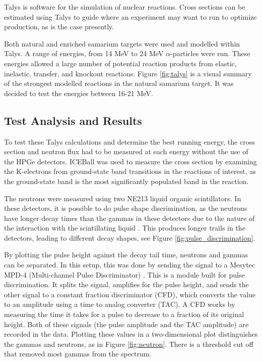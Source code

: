 Talys \citep{koning07:_talys} is software for the simulation of nuclear reactions. Cross sections can be estimated using Talys to guide where an experiment may want to run to optimize production, as is the case presently. 

Both natural and enriched samarium targets were used and modelled within Talys. A range of energies, from 14 MeV to 24 MeV $\alpha$-particles were run. These energies allowed a large number of potential reaction products from elastic, inelastic, transfer, and knockout reactions. Figure \ref{fig:talys} is a visual summary of the strongest modelled reactions in the natural samarium target. It was decided to test the energies between 16-21 MeV.



\subsection{Test Analysis and Results}

To test these Talys calculations and determine the best running energy, the cross section and neutron flux had to be measured at each energy without the use of the HPGe detectors. ICEBall was used to measure the cross section by examining the K-electrons from ground-state band transitions in the reactions of interest, as the ground-state band is the most significantly populated band in the reaction.

The neutrons were measured using two NE213 liquid organic scintillators. In these detectors, it is possible to do pulse shape discrimination, as the neutrons have longer decay times than the gammas in these detectors due to the nature of the interaction with the scintillating liquid \citep{knoll00:rad_det_meas}. This produces longer trails in the detectors, leading to different decay shapes, see Figure \ref{fig:pulse_discrimination}. 



By plotting the pulse height against the decay tail time, neutrons and gammas can be separated. In this setup, this was done by sending the signal to a Mesytec MPD-4 (Multi-channel Pulse Discriminator) \citep{mesytec:_PSD}. This is a module built for pulse discrimination. It splits the signal, amplifies for the pulse height, and sends the other signal to a constant fraction discriminator (CFD), which converts the value to an amplitude using a time to analog converter (TAC). A CFD works by measuring the time it takes for a pulse to decrease to a fraction of its original height. Both of these signals (the pulse amplitude and the TAC amplitude) are recorded in the data. Plotting these values in a two-dimensional plot distinguishes the gammas and neutrons, as in Figure \ref{fig:neutron}. There is a threshold cut off that removed most gammas from the spectrum.


